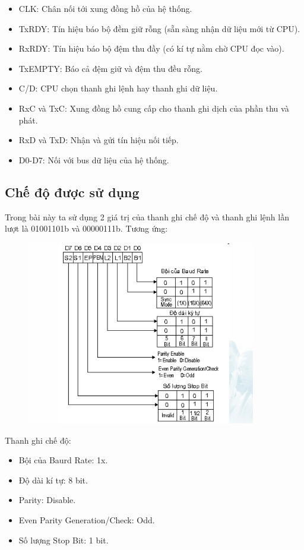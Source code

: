 \documentclass[../report.tex]{subfiles}
\begin{document}
\begin{itemize}
\item CLK: Chân nối tới xung đồng hồ của hệ thống. 
\item TxRDY: Tín hiệu báo bộ đềm giữ rỗng (sẵn sàng nhận dữ liệu mới từ CPU). 
\item RxRDY: Tín hiệu báo bộ đệm thu đầy (có kí tự nằm chờ CPU đọc vào). 
\item TxEMPTY: Báo cả đệm giữ và đệm thu đều rỗng. 
\item C/D: CPU chọn thanh ghi lệnh hay thanh ghi dữ liệu. 
\item RxC và TxC: Xung đồng hồ cung cấp cho thanh ghi dịch của phần thu và phát. 
\item RxD và TxD: Nhận và gửi tín hiệu nối tiếp. 
\item D0-D7: Nối với bus dữ liệu của hệ thống. 
\end{itemize}

\subsection{Chế độ được sử dụng}
Trong bài này ta sử dụng 2 giá trị của thanh ghi chế độ và thanh ghi lệnh lần lượt là 01001101b và 00000111b. 
Tương ứng: \\

\begin{figure}[H]
\centering
\includegraphics[width=10cm]{figures/8251-che-do.png}
\end{figure}

\noindent Thanh ghi chế độ:
\begin{itemize}
\item Bội của Baurd Rate: 1x.
\item Độ dài kí tự: 8 bit. 
\item Parity: Disable. 
\item Even Parity Generation/Check: Odd. 
\item Số lượng Stop Bit: 1 bit. 
\end{itemize}
\end{document}
